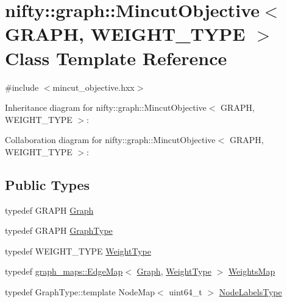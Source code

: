 \hypertarget{classnifty_1_1graph_1_1MincutObjective}{}\section{nifty\+:\+:graph\+:\+:Mincut\+Objective$<$ G\+R\+A\+P\+H, W\+E\+I\+G\+H\+T\+\_\+\+T\+Y\+P\+E $>$ Class Template Reference}
\label{classnifty_1_1graph_1_1MincutObjective}


{\ttfamily \#include $<$mincut\+\_\+objective.\+hxx$>$}



Inheritance diagram for nifty\+:\+:graph\+:\+:Mincut\+Objective$<$ G\+R\+A\+P\+H, W\+E\+I\+G\+H\+T\+\_\+\+T\+Y\+P\+E $>$\+:


Collaboration diagram for nifty\+:\+:graph\+:\+:Mincut\+Objective$<$ G\+R\+A\+P\+H, W\+E\+I\+G\+H\+T\+\_\+\+T\+Y\+P\+E $>$\+:
\subsection*{Public Types}
\begin{DoxyCompactItemize}
\item 
typedef G\+R\+A\+P\+H \hyperlink{classnifty_1_1graph_1_1MincutObjective_aaf6832d24ebaf942e63081c7d01ab05d}{Graph}
\item 
typedef G\+R\+A\+P\+H \hyperlink{classnifty_1_1graph_1_1MincutObjective_ae2da9f8bbdb2d5e7c283b70c78f463c4}{Graph\+Type}
\item 
typedef W\+E\+I\+G\+H\+T\+\_\+\+T\+Y\+P\+E \hyperlink{classnifty_1_1graph_1_1MincutObjective_aeaa856aa2ca34a2d3b3f3e9e250fd831}{Weight\+Type}
\item 
typedef \hyperlink{structnifty_1_1graph_1_1graph__maps_1_1EdgeMap}{graph\+\_\+maps\+::\+Edge\+Map}$<$ \hyperlink{classnifty_1_1graph_1_1MincutObjective_aaf6832d24ebaf942e63081c7d01ab05d}{Graph}, \hyperlink{classnifty_1_1graph_1_1MincutObjective_aeaa856aa2ca34a2d3b3f3e9e250fd831}{Weight\+Type} $>$ \hyperlink{classnifty_1_1graph_1_1MincutObjective_a68accda695f950a00c01c83d3028ccdb}{Weights\+Map}
\item 
typedef Graph\+Type\+::template Node\+Map$<$ uint64\+\_\+t $>$ \hyperlink{classnifty_1_1graph_1_1MincutObjective_a9fb391e13a45b36d341390046c5ea1ac}{Node\+Labels\+Type}
\end{DoxyCompactItemize}
